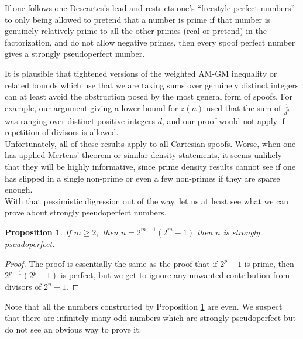 \documentclass{article}
\newtheorem{proposition}[theorem]{Proposition}
\begin{document}
If one follows one Descartes's lead and restricts one's ``freestyle perfect numbers'' to only being allowed to pretend that a number is prime if that number is genuinely relatively prime to all the other primes (real or pretend) in the factorization, and do not allow negative primes, then every spoof perfect number gives a strongly pseudoperfect number. 


It is plausible that tightened versions of the weighted AM-GM inequality or related bounds which use that we are taking sums over genuinely distinct integers can at least avoid the obstruction posed by the most general form of spoofs. For example, our argument giving a lower bound for $z(n)$ used that the sum of $\frac{1}{d^2}$ was ranging over distinct positive integers $d$, and our proof would not apply if repetition of divisors is allowed.\\

Unfortunately, all of these results apply to all Cartesian spoofs. Worse, when one has applied Mertens' theorem or similar density statements, it seems unlikely that they will be highly informative, since prime density results cannot see if one has slipped in a single non-prime or even a few non-primes if they are sparse enough. \\

With that pessimistic digression out of the way, let us at least see what we can prove about strongly pseudoperfect numbers. 


\begin{proposition}    
If $m \geq 2,$ then $n= 2^{m-1}(2^m-1)$ then $n$ is strongly pseudoperfect. \label{Almost Euclid}
\end{proposition}
\begin{proof} The proof is essentially the same as the proof that if $2^p-1$ is prime, then $2^{p-1}(2^p-1)$ is perfect, but we get to ignore any unwanted contribution from divisors of $2^n-1$. 
\end{proof}

Note that all the numbers constructed by Proposition \ref{Almost Euclid} are even. We suspect that there are infinitely many odd numbers which are strongly pseudoperfect but do not see an obvious way to prove it. 
\end{document}
